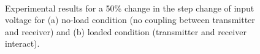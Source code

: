 \documentclass[journal,a4paper,10pt,twoside]{IEEEtran} %
\begin{document}
	 \begin{figure}[t]
	    \begin{center}
	                \\
	                \vspace{-3mm}
	    \end{center}
	    \vspace{-3mm}
	    \caption{Experimental results for a 50\% change in the step change of input voltage for (a) no-load condition (no coupling between transmitter and receiver) and (b) loaded condition (transmitter and receiver interact).}
	    \label{FIG22}
	    \vspace{-3mm}
	\end{figure}
	
\end{document}
